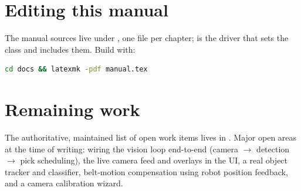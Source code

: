 \section{Editing this manual}
%
The manual sources live under , one file per
chapter;  is the driver that sets the class
and includes them. Build with:
\begin{lstlisting}[language=bash]
cd docs && latexmk -pdf manual.tex
\end{lstlisting}

\section{Remaining work}
%
The authoritative, maintained list of open work items lives in
. Major open areas at the time of writing:
wiring the vision loop end-to-end (camera $\rightarrow$ detection
$\rightarrow$ pick scheduling), the live camera feed and overlays in the
UI, a real object tracker and classifier, belt-motion compensation using
robot position feedback, and a camera calibration wizard.
